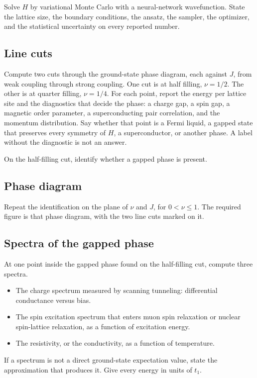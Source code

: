 \documentclass[11pt]{article}
\begin{document}
Solve $H$ by variational Monte Carlo with a neural-network wavefunction. State the lattice size, the boundary conditions, the ansatz, the sampler, the optimizer, and the statistical uncertainty on every reported number.

\subsection{Line cuts}

Compute two cuts through the ground-state phase diagram, each against $J$, from weak coupling through strong coupling. One cut is at half filling, $\nu=1/2$. The other is at quarter filling, $\nu=1/4$. For each point, report the energy per lattice site and the diagnostics that decide the phase: a charge gap, a spin gap, a magnetic order parameter, a superconducting pair correlation, and the momentum distribution. Say whether that point is a Fermi liquid, a gapped state that preserves every symmetry of $H$, a superconductor, or another phase. A label without the diagnostic is not an answer.

On the half-filling cut, identify whether a gapped phase is present.

\subsection{Phase diagram}

Repeat the identification on the plane of $\nu$ and $J$, for $0<\nu\le 1$. The required figure is that phase diagram, with the two line cuts marked on it.

\subsection{Spectra of the gapped phase}

At one point inside the gapped phase found on the half-filling cut, compute three spectra.

\begin{itemize}
\item The charge spectrum measured by scanning tunneling: differential conductance versus bias.
\item The spin excitation spectrum that enters muon spin relaxation or nuclear spin-lattice relaxation, as a function of excitation energy.
\item The resistivity, or the conductivity, as a function of temperature.
\end{itemize}

If a spectrum is not a direct ground-state expectation value, state the approximation that produces it. Give every energy in units of $t_1$.
\end{document}
